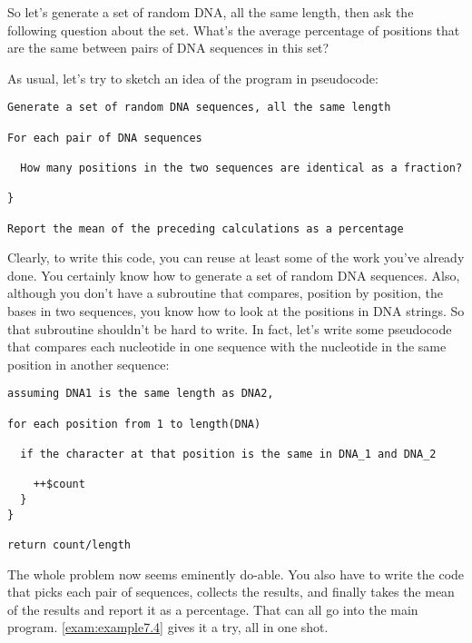 So let's generate a set of random DNA, all the same length, then ask the following question about the set. What's the average percentage of positions that are the same between pairs of DNA sequences in this set?

As usual, let's try to sketch an idea of the program in pseudocode: 

\begin{lstlisting}
Generate a set of random DNA sequences, all the same length

For each pair of DNA sequences

  How many positions in the two sequences are identical as a fraction?

}

Report the mean of the preceding calculations as a percentage
\end{lstlisting}

Clearly, to write this code, you can reuse at least some of the work you've already done. You certainly know how to generate a set of random DNA sequences. Also, although you don't have a subroutine that compares, position by position, the bases in two sequences, you know how to look at the positions in DNA strings. So that subroutine shouldn't be hard to write. In fact, let's write some pseudocode that compares each nucleotide in one sequence with the nucleotide in the same position in another sequence: 

\begin{lstlisting}
assuming DNA1 is the same length as DNA2,

for each position from 1 to length(DNA)

  if the character at that position is the same in DNA_1 and DNA_2

    ++$count
  }
}

return count/length
\end{lstlisting}

The whole problem now seems eminently do-able. You also have to write the code that picks each pair of sequences, collects the results, and finally takes the mean of the results and report it as a percentage. That can all go into the main program. \autoref{exam:example7.4} gives it a try, all in one shot. 



